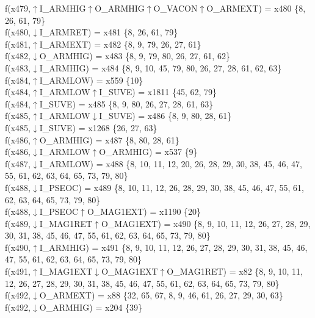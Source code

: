 f(x479,$\uparrow$I\_ARMHIG$\uparrow$O\_ARMHIG$\uparrow$O\_VACON$\uparrow$O\_ARMEXT) = x480 \{8, 26, 61, 79\} \\  
f(x480,$\downarrow$I\_ARMRET) = x481 \{8, 26, 61, 79\} \\  
f(x481,$\uparrow$I\_ARMEXT) = x482 \{8, 9, 79, 26, 27, 61\} \\  
f(x482,$\downarrow$O\_ARMHIG) = x483 \{8, 9, 79, 80, 26, 27, 61, 62\} \\  
f(x483,$\downarrow$I\_ARMHIG) = x484 \{8, 9, 10, 45, 79, 80, 26, 27, 28, 61, 62, 63\} \\  
f(x484,$\uparrow$I\_ARMLOW) = x559 \{10\} \\  
f(x484,$\uparrow$I\_ARMLOW$\uparrow$I\_SUVE) = x1811 \{45, 62, 79\} \\  
f(x484,$\uparrow$I\_SUVE) = x485 \{8, 9, 80, 26, 27, 28, 61, 63\} \\  
f(x485,$\uparrow$I\_ARMLOW$\downarrow$I\_SUVE) = x486 \{8, 9, 80, 28, 61\} \\  
f(x485,$\downarrow$I\_SUVE) = x1268 \{26, 27, 63\} \\  
f(x486,$\uparrow$O\_ARMHIG) = x487 \{8, 80, 28, 61\} \\  
f(x486,$\downarrow$I\_ARMLOW$\uparrow$O\_ARMHIG) = x537 \{9\} \\  
f(x487,$\downarrow$I\_ARMLOW) = x488 \{8, 10, 11, 12, 20, 26, 28, 29, 30, 38, 45, 46, 47, 55, 61, 62, 63, 64, 65, 73, 79, 80\} \\  
f(x488,$\downarrow$I\_PSEOC) = x489 \{8, 10, 11, 12, 26, 28, 29, 30, 38, 45, 46, 47, 55, 61, 62, 63, 64, 65, 73, 79, 80\} \\  
f(x488,$\downarrow$I\_PSEOC$\uparrow$O\_MAG1EXT) = x1190 \{20\} \\  
f(x489,$\downarrow$I\_MAG1RET$\uparrow$O\_MAG1EXT) = x490 \{8, 9, 10, 11, 12, 26, 27, 28, 29, 30, 31, 38, 45, 46, 47, 55, 61, 62, 63, 64, 65, 73, 79, 80\} \\  
f(x490,$\uparrow$I\_ARMHIG) = x491 \{8, 9, 10, 11, 12, 26, 27, 28, 29, 30, 31, 38, 45, 46, 47, 55, 61, 62, 63, 64, 65, 73, 79, 80\} \\  
f(x491,$\uparrow$I\_MAG1EXT$\downarrow$O\_MAG1EXT$\uparrow$O\_MAG1RET) = x82 \{8, 9, 10, 11, 12, 26, 27, 28, 29, 30, 31, 38, 45, 46, 47, 55, 61, 62, 63, 64, 65, 73, 79, 80\} \\  
f(x492,$\downarrow$O\_ARMEXT) = x88 \{32, 65, 67, 8, 9, 46, 61, 26, 27, 29, 30, 63\} \\  
f(x492,$\downarrow$O\_ARMHIG) = x204 \{39\} \\  
